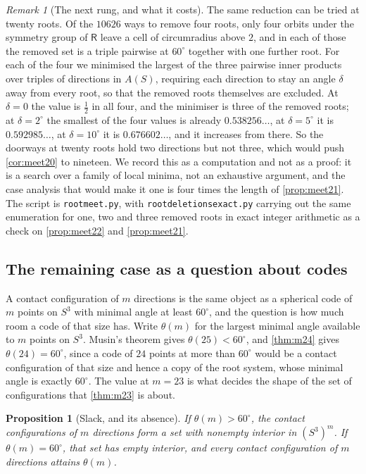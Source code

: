 \documentclass[11pt,reqno]{amsart}
\renewcommand{\_}{\origunderscore\allowbreak}
\numberwithin{equation}{section}
\theoremstyle{plain}
\newtheorem{prop}[thm]{Proposition}
\theoremstyle{definition}
\theoremstyle{remark}
\newtheorem{remark}[thm]{Remark}
\newcommand{\Rt}{\mathsf{R}}                 %
\begin{document}
\begin{remark}[The next rung, and what it costs]\label{rem:meet-next}
The same reduction can be tried at twenty roots. Of the $10626$ ways to
remove four roots, only four orbits under the symmetry group of $\Rt$
leave a cell of circumradius above $2$, and in each of those the removed
set is a triple pairwise at $60^\circ$ together with one further root.
For each of the four we minimised the largest of the three pairwise
inner products over triples of directions in $A(S)$, requiring each
direction to stay an angle $\delta$ away from every root, so that the
removed roots themselves are excluded. At $\delta=0$ the value is
$\tfrac12$ in all four, and the minimiser is three of the removed roots;
at $\delta=2^\circ$ the smallest of the four values is already
$0.538256\ldots$, at $\delta=5^\circ$ it is $0.592985\ldots$, at
$\delta=10^\circ$ it is $0.676602\ldots$, and it increases from there. So the
doorways at twenty roots hold two directions but not three, which would
push \cref{cor:meet20} to nineteen. We record this as a computation and
not as a proof: it is a search over a family of local minima, not an
exhaustive argument, and the case analysis that would make it one is
four times the length of \cref{prop:meet21}. The script is
\texttt{root\_meet.py}, with \texttt{root\_deletions\_exact.py} carrying
out the same enumeration for one, two and three removed roots in exact
integer arithmetic as a check on \cref{prop:meet22} and
\cref{prop:meet21}.
\end{remark}

\subsection{The remaining case as a question about codes}\label{sec:m23-codes}

A contact configuration of $m$ directions is the same object as a
spherical code of $m$ points on $S^3$ with minimal angle at least
$60^\circ$, and the question is how much room a code of that size has.
Write $\theta(m)$ for the largest minimal angle available to $m$
points on $S^3$. Musin's theorem \cite{Mus08} gives
$\theta(25)<60^\circ$, and \cref{thm:m24} gives $\theta(24)=60^\circ$,
since a code of $24$ points at more than $60^\circ$ would be a contact
configuration of that size and hence a copy of the root system, whose
minimal angle is exactly $60^\circ$. The value at $m=23$ is what decides
the shape of the set of configurations that \cref{thm:m23} is about.

\begin{prop}[Slack, and its absence]\label{prop:code-slack}
If $\theta(m)>60^\circ$, the contact configurations of $m$ directions
form a set with nonempty interior in $(S^3)^m$. If $\theta(m)=60^\circ$,
that set has empty interior, and every contact configuration of $m$
directions attains $\theta(m)$.
\end{prop}
\end{document}
